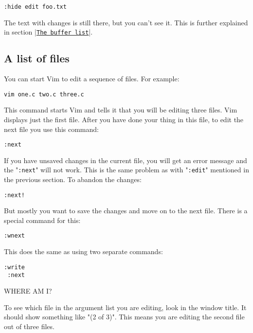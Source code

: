  \begin{Verbatim}[samepage=true]
 :hide edit foo.txt
 \end{Verbatim}

The text with changes is still there, but you can't see it.
This is further explained in section |\hyperref[The buffer list]{\texttt{The buffer list}}|.

\subsection{A list of files}
You can start Vim to edit a sequence of files.  For example:

 \begin{Verbatim}[samepage=true]
 vim one.c two.c three.c
 \end{Verbatim}

This command starts Vim and tells it that you will be editing three files.
Vim displays just the first file.
After you have done your thing in this file, to edit the next file you use this command:

 \begin{Verbatim}[samepage=true]
 :next
 \end{Verbatim}

If you have unsaved changes in the current file, you will get an error message and the "\verb!:next!" will not work.
This is the same problem as with "\verb!:edit!" mentioned in the previous section.
To abandon the changes:

 \begin{Verbatim}[samepage=true]
 :next!
 \end{Verbatim}

But mostly you want to save the changes and move on to the next file.
There is a special command for this:

 \begin{Verbatim}[samepage=true]
 :wnext
 \end{Verbatim}

This does the same as using two separate commands:

 \begin{Verbatim}[samepage=true]
 :write
 :next
 \end{Verbatim}

WHERE AM I?

To see which file in the argument list you are editing, look in the window title.
It should show something like "(2 of 3)".
This means you are editing the second file out of three files.

